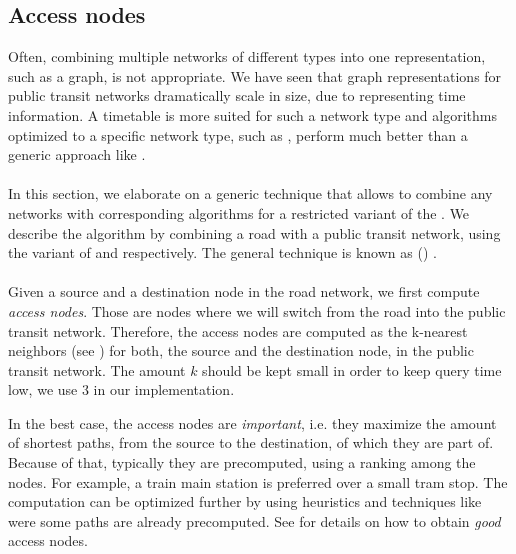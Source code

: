 \subsection{Access nodes}\label{accessNodes}
	Often, combining multiple networks of different types into one representation, such as a graph, is not appropriate.
	We have seen that graph representations for public transit networks dramatically scale in size, due to
	representing time information. A timetable is more suited for such a network type and algorithms optimized to a
	specific network type, such as \csa, perform much better than a generic approach like \dijkstra.\\\\
	In this section, we elaborate on a generic technique that allows to combine any networks with corresponding algorithms
	for a restricted variant of the \shortestPathProblem. We describe the algorithm by combining a road with a public transit
	network, using the \multiModal variant of \alt and \csa respectively. The general technique is known as \accessNodeRouting (\anr)
	.\\\\
	Given a source and a destination node in the road network, we first compute \textit{access nodes}.
	Those are nodes where we will switch from the road into the public transit network. Therefore, the access nodes
	are computed as the k-nearest neighbors (see ) for both, the source and the destination node,
	in the public transit network. The amount $k$ should be kept small in order to keep query time low, we use $3$ in our implementation.
	
	In the best case, the access nodes are \textit{important}, i.e. they maximize the amount of shortest paths, from the
	source to the destination, of which they are part of. Because of that, typically they are precomputed, using a ranking among the
	nodes. For example, a train main station is preferred over a small tram stop. The computation can be optimized further by using
	heuristics and techniques like \alt were some paths are already precomputed. See  for details on
	how to obtain \textit{good} access nodes.
	
